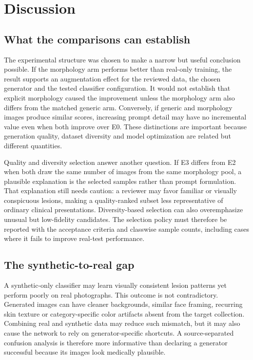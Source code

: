 \section{Discussion}
\subsection{What the comparisons can establish}
The experimental structure was chosen to make a narrow but useful conclusion possible. If the morphology arm performs better than real-only training, the result supports an augmentation effect for the reviewed data, the chosen generator and the tested classifier configuration. It would not establish that explicit morphology caused the improvement unless the morphology arm also differs from the matched generic arm. Conversely, if generic and morphology images produce similar scores, increasing prompt detail may have no incremental value even when both improve over E0. These distinctions are important because generation quality, dataset diversity and model optimization are related but different quantities.

Quality and diversity selection answer another question. If E3 differs from E2 when both draw the same number of images from the same morphology pool, a plausible explanation is the selected samples rather than prompt formulation. That explanation still needs caution: a reviewer may favor familiar or visually conspicuous lesions, making a quality-ranked subset less representative of ordinary clinical presentations. Diversity-based selection can also overemphasize unusual but low-fidelity candidates. The selection policy must therefore be reported with the acceptance criteria and classwise sample counts, including cases where it fails to improve real-test performance.

\subsection{The synthetic-to-real gap}
A synthetic-only classifier may learn visually consistent lesion patterns yet perform poorly on real photographs. This outcome is not contradictory. Generated images can have cleaner backgrounds, similar face framing, recurring skin texture or category-specific color artifacts absent from the target collection. Combining real and synthetic data may reduce such mismatch, but it may also cause the network to rely on generator-specific shortcuts. A source-separated confusion analysis is therefore more informative than declaring a generator successful because its images look medically plausible.

